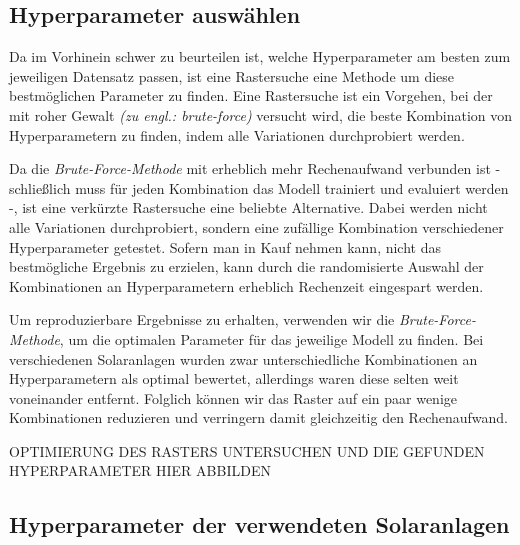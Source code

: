 \documentclass[12pt, a4paper]{article}
\begin{document}
%

\subsection{Hyperparameter auswählen}

Da im Vorhinein schwer zu beurteilen ist, welche Hyperparameter am besten zum jeweiligen Datensatz passen, ist eine Rastersuche eine Methode um diese bestmöglichen Parameter zu finden. Eine Rastersuche ist ein Vorgehen, bei der mit roher Gewalt \textit{(zu engl.: brute-force)} versucht wird, die beste Kombination von Hyperparametern zu finden, indem alle Variationen durchprobiert werden.

Da die \textit{Brute-Force-Methode} mit erheblich mehr Rechenaufwand verbunden ist - schließlich muss für jeden Kombination das Modell trainiert und evaluiert werden -, ist eine verkürzte Rastersuche eine beliebte Alternative. Dabei werden nicht alle Variationen durchprobiert, sondern eine zufällige Kombination verschiedener Hyperparameter getestet. Sofern man in Kauf nehmen kann, nicht das bestmögliche Ergebnis zu erzielen, kann durch die randomisierte Auswahl der Kombinationen an Hyperparametern erheblich Rechenzeit eingespart werden.

Um reproduzierbare Ergebnisse zu erhalten, verwenden wir die \textit{Brute-Force-Methode}, um die optimalen Parameter für das jeweilige Modell zu finden. Bei verschiedenen Solaranlagen wurden zwar unterschiedliche Kombinationen an Hyperparametern als optimal bewertet, allerdings waren diese selten weit voneinander entfernt. Folglich können wir das Raster auf ein paar wenige Kombinationen reduzieren und verringern damit gleichzeitig den Rechenaufwand.

OPTIMIERUNG DES RASTERS UNTERSUCHEN UND DIE GEFUNDEN HYPERPARAMETER HIER ABBILDEN

\subsection{Hyperparameter der verwendeten Solaranlagen}
\end{document}
